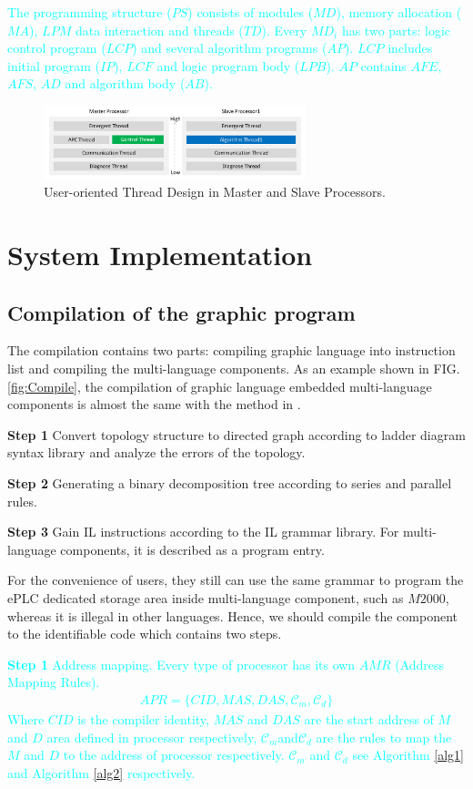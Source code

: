 \documentclass[journal,UTF8]{IEEEtran}
\begin{document}
\textcolor{cyan}{The programming structure ($PS$) consists of modules ($MD$), memory allocation ($MA$), $LPM$ data interaction and threads ($TD$). Every $MD_i$ has two parts: logic control program ($LCP$) and several algorithm programs ($AP$). $LCP$ includes initial program ($IP$), $LCF$ and logic program body ($LPB$). $AP$ contains $AFE$,$AFS$, $AD$ and algorithm body ($AB$).} 

\begin{figure}
	\centering
	\includegraphics[width=3in]{fig/FIG5.pdf}
	\caption{ User-oriented Thread Design in Master and Slave Processors.}
	\label{fig:Threads}
\end{figure}
 \section{System Implementation}
 \label{Process}
 \subsection{Compilation of the graphic program}
 The compilation contains two parts: compiling graphic language into instruction list and compiling the multi-language components. As an example shown in FIG. \ref{fig:Compile}, the compilation of graphic language embedded multi-language components is almost the same with the method in \cite{Yan2010Compiling}.
 	
 \textbf{Step 1} Convert topology structure to directed graph according to ladder diagram syntax library and analyze the errors of the topology.
 	
 \textbf{Step 2} Generating a binary decomposition tree according to series and parallel rules.
 	
 \textbf{Step 3} Gain IL instructions according to the IL grammar library. For multi-language components, it is described as a program entry.
 
 For the convenience of users, they still can use the same grammar to program the ePLC dedicated storage area inside multi-language component, such as $M2000$, whereas it is illegal in other languages. Hence, we should compile the component to the identifiable code which contains two steps. 
 	
 \textcolor{cyan}{\textbf{Step 1} Address mapping. Every type of processor has its own $AMR$ (Address Mapping Rules).
 \begin{eqnarray}
  APR = \{CID,MAS,DAS,\mathcal{C}_m, \mathcal{C}_d\}
 \end{eqnarray}
 Where $CID$ is the compiler identity, $MAS$ and $DAS$ are the start address of $M$ and $D$ area defined in processor respectively, $\mathcal{C}_m$and$\mathcal{C}_d$ are the rules to map the $M$ and $D$ to  the address of processor respectively. $\mathcal{C}_m$ and $ \mathcal{C}_d$ see Algorithm \ref{alg1} and Algorithm \ref{alg2} respectively.}
 
\end{document}
